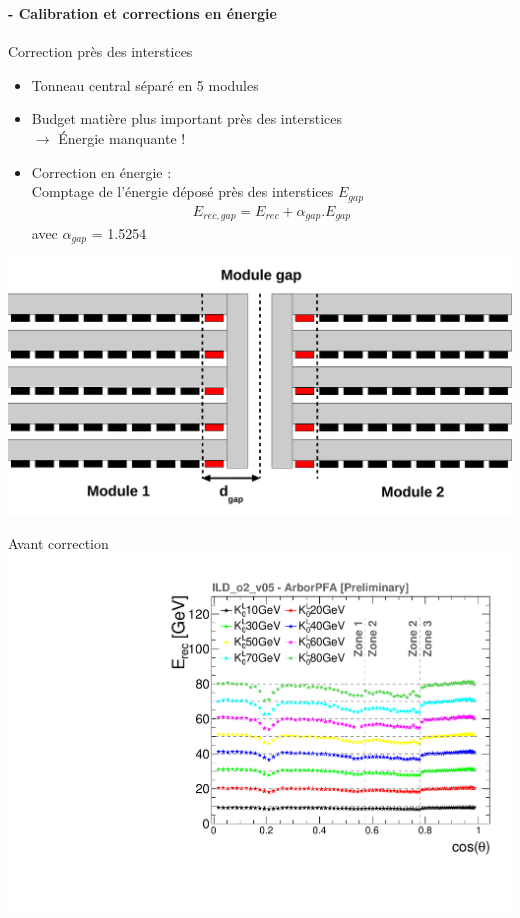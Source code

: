 \documentclass[8pt]{beamer}
\begin{document}
  \begin{frame}
  \frametitle{\secname}
  \framesubtitle{\subsecname - Calibration et corrections en énergie}
    \begin{minipage}{0.53\linewidth}
      \begin{block}{Correction près des interstices}
        \begin{itemize}
          \item Tonneau central séparé en 5 modules
          \item Budget matière plus important près des interstices \\
          $\rightarrow$ Énergie manquante !
          \item Correction en énergie : \\
          Comptage de l'énergie déposé près des interstices $E_{gap}$
          \begin{align*}
            E_{rec,gap} = E_{rec} + \alpha_{gap}.E_{gap}
          \end{align*}
          avec $\alpha_{gap}$ = 1.5254
        \end{itemize}
      \end{block}
      \begin{center}
        \includegraphics[width=\linewidth]{ModuleGap.pdf}
      \end{center}
    \end{minipage} \hfill
    \begin{minipage}{0.46\linewidth}
      \begin{center}
        Avant correction \\ \includegraphics[width=0.75\linewidth]{ERec_thesis.pdf} \\

\end{center}
\end{minipage}
\end{frame}
\end{document}
